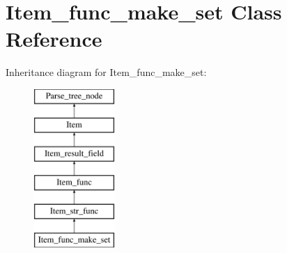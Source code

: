 \hypertarget{classItem__func__make__set}{}\section{Item\+\_\+func\+\_\+make\+\_\+set Class Reference}
\label{classItem__func__make__set}
Inheritance diagram for Item\+\_\+func\+\_\+make\+\_\+set\+:\begin{figure}[H]
\begin{center}
\leavevmode
\includegraphics[height=6.000000cm]{classItem__func__make__set}
\end{center}
\end{figure}
